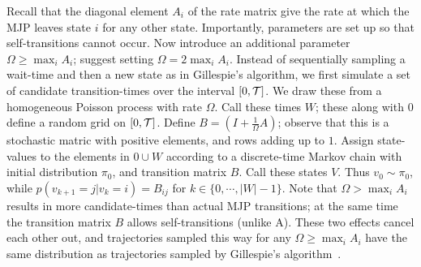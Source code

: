Recall that the diagonal element $A_i$ of the rate matrix give the 
rate at which the MJP leaves state $i$ for any other state. Importantly,
parameters are set up so that self-transitions cannot occur. 
Now introduce an additional parameter $\Omega \ge \max_i A_i$;
\cite{RaoTeh13} suggest setting $\Omega = 2 \max_i A_i$. 
Instead of sequentially sampling a wait-time and then a new state as
in Gillespie's algorithm, we first simulate a set of candidate
transition-times over the interval $[0,{\mathcal T}]$. We draw these from a homogeneous 
Poisson process with rate $\Omega$. Call these times $W$; these along with $0$ 
define a random grid on $[0,{\mathcal T}]$.
Define $B = \left(I +\frac{1}{\Omega}A\right)$; observe that this is a
stochastic matric with positive elements, and rows adding up to $1$.
Assign state-values to the elements in $0 \cup W$ according to a discrete-time 
Markov chain with initial distribution $\pi_0$, and transition matrix $B$.
Call these states $V$. Thus $v_0 \sim \pi_0$, while $p(v_{k+1}=j|v_k=i) = B_{ij}$
for $k \in \{0,\cdots,|W|-1\}$.
Note that $\Omega > \max_i A_i$ results in more
candidate-times than actual MJP transitions; at the same time the transition
matrix $B$ allows self-transitions (unlike A). These two effects cancel
each other out, and trajectories sampled this way for any $\Omega \ge \max_i A_i$
have the same distribution as trajectories
sampled by Gillespie's algorithm~\cite{Jen1953,RaoTeh13}.

